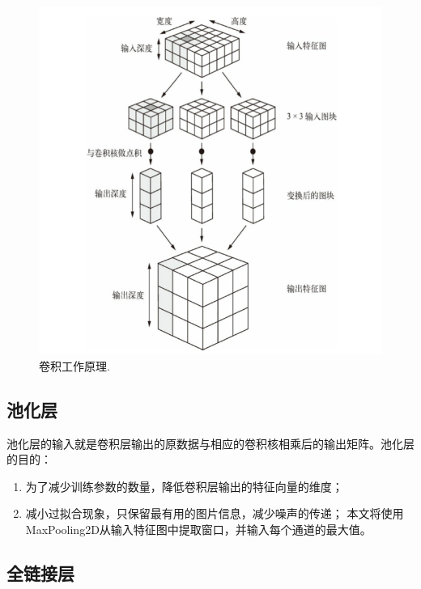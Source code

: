 \documentclass[lang=cn,11pt]{elegantpaper}
\begin{document}
\begin{figure}[hbtp]
	\centering
  \includegraphics{conv1.png}
  \caption{卷积工作原理.\label{fig:conv1}}
\end{figure}

\subsection{池化层}
池化层的输入就是卷积层输出的原数据与相应的卷积核相乘后的输出矩阵。池化层的目的：
\begin{enumerate}
	\item 为了减少训练参数的数量，降低卷积层输出的特征向量的维度；
	\item 减小过拟合现象，只保留最有用的图片信息，减少噪声的传递；
本文将使用MaxPooling2D从输入特征图中提取窗口，并输入每个通道的最大值。
\end{enumerate}

\subsection{全链接层}
\end{document}
